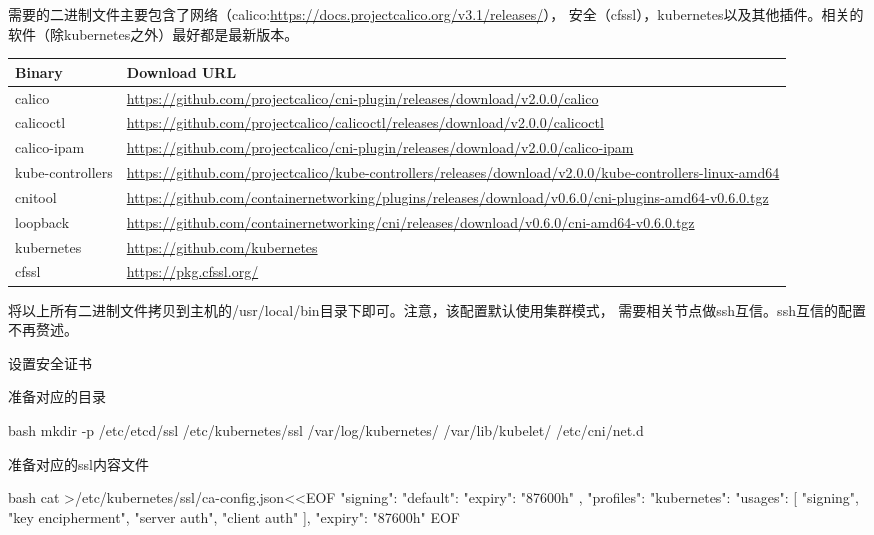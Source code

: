\begin{outline}[enumerate]
需要的二进制文件主要包含了网络（calico:\url{https://docs.projectcalico.org/v3.1/releases/}），
安全（cfssl），kubernetes以及其他插件。相关的软件（除kubernetes之外）最好都是最新版本。
\par{} \linewidth\textwidth
  \label{tab:k8s_binary_files}
  \begin{xltabular}{\textwidth}{|l|X|}
  \hline
  Binary & Download URL\\ \hline
  calico & \url{https://github.com/projectcalico/cni-plugin/releases/download/v2.0.0/calico}\\
  calicoctl & \url{https://github.com/projectcalico/calicoctl/releases/download/v2.0.0/calicoctl} \\
  calico-ipam & \url{https://github.com/projectcalico/cni-plugin/releases/download/v2.0.0/calico-ipam} \\
  kube-controllers & \url{https://github.com/projectcalico/kube-controllers/releases/download/v2.0.0/kube-controllers-linux-amd64} \\
  cnitool & \url{https://github.com/containernetworking/plugins/releases/download/v0.6.0/cni-plugins-amd64-v0.6.0.tgz} \\
  loopback & \url{https://github.com/containernetworking/cni/releases/download/v0.6.0/cni-amd64-v0.6.0.tgz} \\
  kubernetes & \url{https://github.com/kubernetes} \\
  cfssl & \url{https://pkg.cfssl.org/} \\
  \hline
  \end{xltabular}
将以上所有二进制文件拷贝到主机的/usr/local/bin目录下即可。注意，该配置默认使用集群模式，
需要相关节点做ssh互信。ssh互信的配置不再赘述。

  \1 设置安全证书

准备对应的目录
\begin{code-block}{bash}
mkdir -p /etc/etcd/ssl /etc/kubernetes/ssl /var/log/kubernetes/ /var/lib/kubelet/ /etc/cni/net.d
\end{code-block}
准备对应的ssl内容文件
\begin{code-block}{bash}
cat >/etc/kubernetes/ssl/ca-config.json<<EOF
{
    "signing": {
        "default": {
            "expiry": "87600h"
        },
        "profiles": {
            "kubernetes": {
                "usages": [
                    "signing",
                    "key encipherment",
                    "server auth",
                    "client auth"
                ],
                "expiry": "87600h"
            }
        }
    }
}
EOF


\end{code-block}
\end{outline}
